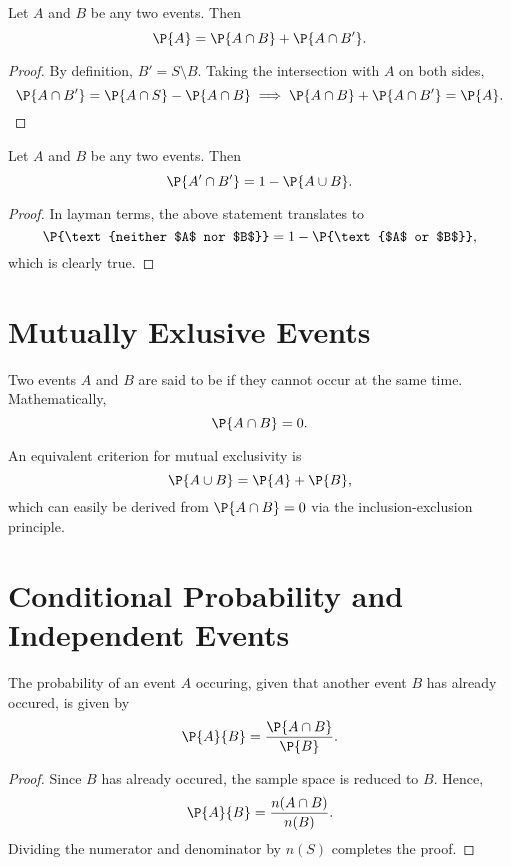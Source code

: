 \begin{proposition}
    Let $A$ and $B$ be any two events. Then \[\P{A} = \P{A \cap B} + \P{A \cap B'}.\]
\end{proposition}
\begin{proof}
    By definition, $B' = S \setminus B$. Taking the intersection with $A$ on both sides, \[\P{A \cap B'} = \P{A \cap S} - \P{A \cap B} \implies \P{A \cap B} + \P{A \cap B'} = \P{A}.\]
\end{proof}

\begin{proposition}
    Let $A$ and $B$ be any two events. Then \[\P{A' \cap B'} = 1 - \P{A \cup B}.\]
\end{proposition}
\begin{proof}
    In layman terms, the above statement translates to \[\P{\text{neither $A$ nor $B$}} = 1 - \P{\text{$A$ or $B$}},\] which is clearly true.
\end{proof}

\section{Mutually Exlusive Events}

\begin{definition}
    Two events $A$ and $B$ are said to be  if they cannot occur at the same time. Mathematically, \[\P{A \cap B} = 0.\]
\end{definition}

An equivalent criterion for mutual exclusivity is \[\P{A \cup B} = \P{A} + \P{B},\] which can easily be derived from $\P{A \cap B} = 0$ via the inclusion-exclusion principle.

\section{Conditional Probability and Independent Events}

\begin{proposition}
    The probability of an event $A$ occuring, given that another event $B$ has already occured, is given by \[\P{A}{B} = \frac{\P{A \cap B}}{\P{B}}.\]
\end{proposition}
\begin{proof}
    Since $B$ has already occured, the sample space is reduced to $B$. Hence, \[\P{A}{B} = \frac{n(A \cap B)}{n(B)}.\] Dividing the numerator and denominator by $n(S)$ completes the proof.
\end{proof}

